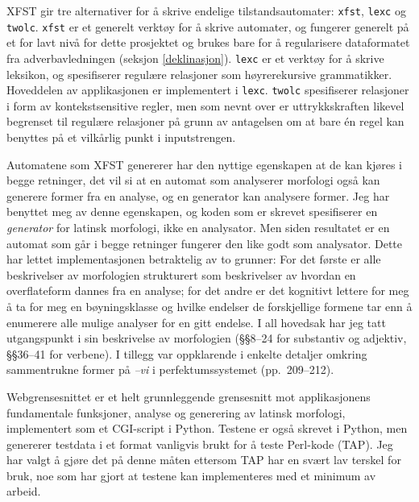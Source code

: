 \documentclass{article}
\let\prog\texttt
\let\w\emph
\begin{document}
XFST gir tre alternativer for \aa{} skrive endelige tilstandsautomater:
\prog{xfst}, \prog{lexc} og \prog{twolc}. \prog{xfst} er et generelt
verkt\o{}y for \aa{} skrive automater, og fungerer generelt p\aa{} et for lavt
niv\aa{} for dette prosjektet og brukes bare for \aa{} regularisere
dataformatet fra adverbavledningen (seksjon \ref{deklinasjon}). \prog{lexc} er
et verkt\o{}y for \aa{} skrive leksikon, og spesifiserer regul\ae{}re
relasjoner som h\o{}yrerekursive grammatikker. Hoveddelen av applikasjonen er
implementert i \prog{lexc}. \prog{twolc} spesifiserer relasjoner i form av
kontekstsensitive regler, men som nevnt over er uttrykkskraften likevel
begrenset til regul\ae{}re relasjoner p\aa{} grunn av antagelsen om at bare
\'en regel kan benyttes p\aa{} et vilk\aa{}rlig punkt i inputstrengen.
\cite{xfst,twolc}

Automatene som XFST genererer har den nyttige egenskapen at de kan kj\o{}res i
begge retninger, det vil si at en automat som analyserer morfologi ogs\aa{}
kan generere former fra en analyse, og en generator kan analysere former. Jeg
har benyttet meg av denne egenskapen, og koden som er skrevet spesifiserer en
\emph{generator} for latinsk morfologi, ikke en analysator. Men siden
resultatet er en automat som g\aa{}r i begge retninger fungerer den like godt
som analysator. Dette har lettet implementasjonen betraktelig av to grunner:
For det f\o{}rste er alle beskrivelser av morfologien strukturert som
beskrivelser av hvordan en overflateform dannes fra en analyse; for det andre
er det kognitivt lettere for meg \aa{} ta for meg en b\o{}yningsklasse og
hvilke endelser de forskjellige formene tar enn \aa{} enumerere alle mulige
analyser for en gitt endelse. I all hovedsak har jeg tatt utgangspunkt i
 sin beskrivelse av morfologien (\S\S 8--24 for substantiv og
adjektiv, \S\S 36--41 for verbene). I tillegg var  oppklarende i
enkelte detaljer omkring sammentrukne former p\aa{} \w{--vi} i
perfektumssystemet (pp.~209--212).

Webgrensesnittet er et helt grunnleggende grensesnitt mot applikasjonens
fundamentale funksjoner, analyse og generering av latinsk morfologi,
implementert som et CGI-script i Python. Testene er ogs\aa{} skrevet i Python,
men genererer testdata i et format vanligvis brukt for \aa{} teste Perl-kode
(TAP). Jeg har valgt \aa{} gj\o{}re det p\aa{} denne m\aa{}ten ettersom TAP
har en sv\ae{}rt lav terskel for bruk, noe som har gjort at testene kan
implementeres med et minimum av arbeid.
\end{document}
